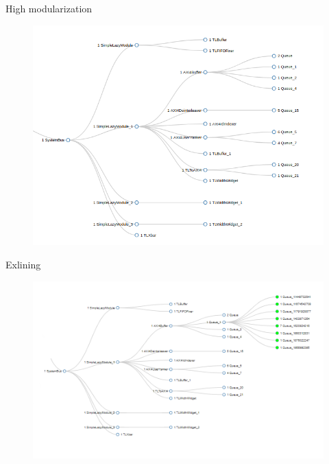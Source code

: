 \documentclass[aspectratio=169]{beamer}
\begin{document}
\begin{frame}{High modularization}
        \begin{figure}
        \centering
        \includegraphics[scale=0.42]{images/SystemBus.png}
        \end{figure}
        \begin{center}
            \href{url}{}
        \end{center}
\end{frame}

\begin{frame}{Exlining}
        \begin{figure}
        \centering
        \includegraphics[scale=0.42]{images/SystemBus_exlined.png}
        \end{figure}
        \begin{center}
            \href{url}{}
        \end{center}
\end{frame}
\end{document}
